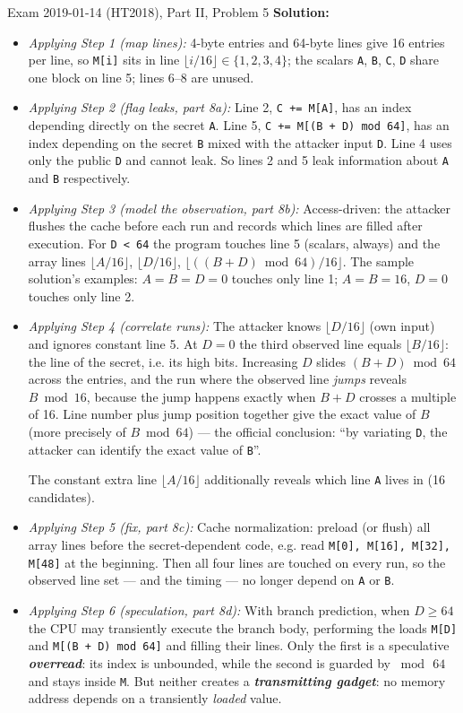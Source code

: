 \documentclass[12pt, a4paper]{article}
\newcommand{\term}[1]{\textbf{\textit{#1}}}        %
\begin{document}
\begin{practicebox}{Exam 2019-01-14 (HT2018), Part II, Problem 5}
\textbf{Solution:}
\begin{itemize}
    \item \textit{Applying Step 1 (map lines):} 4-byte entries and 64-byte lines give 16 entries per line, so \texttt{M[i]} sits in line $\lfloor i/16 \rfloor \in \{1,2,3,4\}$; the scalars \texttt{A}, \texttt{B}, \texttt{C}, \texttt{D} share one block on line 5; lines 6--8 are unused.
    \item \textit{Applying Step 2 (flag leaks, part 8a):} Line 2, \texttt{C += M[A]}, has an index depending directly on the secret \texttt{A}. Line 5, \texttt{C += M[(B + D) mod 64]}, has an index depending on the secret \texttt{B} mixed with the attacker input \texttt{D}.
    Line 4 uses only the public \texttt{D} and cannot leak. So lines 2 and 5 leak information about \texttt{A} and \texttt{B} respectively.
    \item \textit{Applying Step 3 (model the observation, part 8b):} Access-driven: the attacker flushes the cache before each run and records which lines are filled after execution. For \texttt{D < 64} the program touches line 5 (scalars, always) and the array lines $\lfloor A/16 \rfloor$, $\lfloor D/16 \rfloor$, $\lfloor ((B + D) \bmod 64)/16 \rfloor$. The sample solution's examples: $A = B = D = 0$ touches only line 1; $A = B = 16$, $D = 0$ touches only line 2.
    \item \textit{Applying Step 4 (correlate runs):} The attacker knows $\lfloor D/16 \rfloor$ (own input) and ignores constant line 5. At $D = 0$ the third observed line equals $\lfloor B/16 \rfloor$: the line of the secret, i.e. its high bits.
    Increasing $D$ slides $(B + D) \bmod 64$ across the entries, and the run where the observed line \emph{jumps} reveals $B \bmod 16$, because the jump happens exactly when $B + D$ crosses a multiple of 16.
    Line number plus jump position together give the exact value of $B$ (more precisely of $B \bmod 64$) --- the official conclusion: ``by variating \texttt{D}, the attacker can identify the exact value of \texttt{B}''.

    The constant extra line $\lfloor A/16 \rfloor$ additionally reveals which line \texttt{A} lives in (16 candidates).
    \item \textit{Applying Step 5 (fix, part 8c):} Cache normalization: preload (or flush) all array lines before the secret-dependent code, e.g. read \texttt{M[0], M[16], M[32], M[48]} at the beginning. Then all four lines are touched on every run, so the observed line set --- and the timing --- no longer depend on \texttt{A} or \texttt{B}.
    \item \textit{Applying Step 6 (speculation, part 8d):} With branch prediction, when $D \geq 64$ the CPU may transiently execute the branch body, performing the loads \texttt{M[D]} and \texttt{M[(B + D) mod 64]} and filling their lines.
    Only the first is a speculative \term{overread}: its index is unbounded, while the second is guarded by $\bmod\, 64$ and stays inside \texttt{M}. But neither creates a \term{transmitting gadget}: no memory address depends on a transiently \emph{loaded} value.


\end{itemize}
\end{practicebox}
\end{document}
